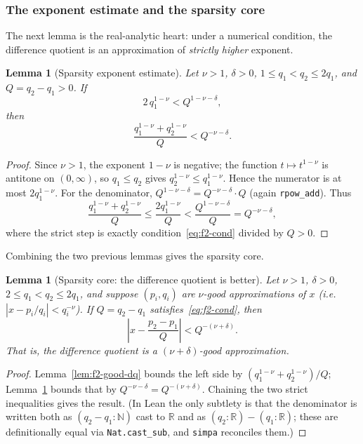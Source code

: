 \documentclass[11pt]{amsart}
\newtheorem{lemma}[theorem]{Lemma}
\theoremstyle{definition}
\theoremstyle{remark}
\numberwithin{equation}{section}
\newcommand{\R}{\mathbb{R}}
\newcommand{\N}{\mathbb{N}}
\begin{document}
\subsubsection{The exponent estimate and the sparsity core}

The next lemma is the real-analytic heart: under a numerical condition, the difference quotient is an approximation of \emph{strictly higher} exponent.

\begin{lemma}[Sparsity exponent estimate]\label{lem:f2-exp}
Let $\nu>1$, $\delta>0$, $1\le q_1<q_2\le2q_1$, and $Q=q_2-q_1>0$. If
\begin{equation}\label{eq:f2-cond}
2\,q_1^{1-\nu}<Q^{1-\nu-\delta},
\end{equation}
then
\[
\frac{q_1^{1-\nu}+q_2^{1-\nu}}{Q}<Q^{-\nu-\delta}.
\]
\end{lemma}
\begin{proof}
Since $\nu>1$, the exponent $1-\nu$ is negative; the function $t\mapsto t^{1-\nu}$ is antitone on $(0,\infty)$, so $q_1\le q_2$ gives $q_2^{1-\nu}\le q_1^{1-\nu}$. Hence the numerator is at most $2q_1^{1-\nu}$. For the denominator, $Q^{1-\nu-\delta}=Q^{-\nu-\delta}\cdot Q$ (again \texttt{rpow\_add}). Thus
\[
\frac{q_1^{1-\nu}+q_2^{1-\nu}}{Q}\le\frac{2q_1^{1-\nu}}{Q}<\frac{Q^{1-\nu-\delta}}{Q}=Q^{-\nu-\delta},
\]
where the strict step is exactly condition~\eqref{eq:f2-cond} divided by $Q>0$.
\end{proof}

Combining the two previous lemmas gives the sparsity core.

\begin{lemma}[Sparsity core: the difference quotient is better]\label{lem:f2-core}
Let $\nu>1$, $\delta>0$, $2\le q_1<q_2\le2q_1$, and suppose $(p_i,q_i)$ are $\nu$-good approximations of $x$ (i.e.\ $|x-p_i/q_i|<q_i^{-\nu}$). If $Q=q_2-q_1$ satisfies~\eqref{eq:f2-cond}, then
\[
\left|x-\frac{p_2-p_1}{Q}\right|<Q^{-(\nu+\delta)}.
\]
That is, the difference quotient is a $(\nu+\delta)$-good approximation.
\end{lemma}
\begin{proof}
Lemma~\ref{lem:f2-good-dq} bounds the left side by $(q_1^{1-\nu}+q_2^{1-\nu})/Q$; Lemma~\ref{lem:f2-exp} bounds that by $Q^{-\nu-\delta}=Q^{-(\nu+\delta)}$. Chaining the two strict inequalities gives the result. (In Lean the only subtlety is that the denominator is written both as $(q_2-q_1:\N)$ cast to $\R$ and as $(q_2:\R)-(q_1:\R)$; these are definitionally equal via \texttt{Nat.cast\_sub}, and \texttt{simpa} reconciles them.)
\end{proof}
\end{document}
